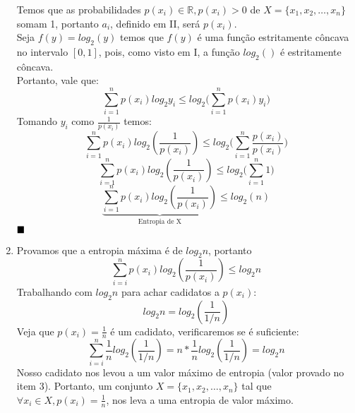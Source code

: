 \documentclass[12pt]{article}
\newcommand{\bb}[1]{\mathbb{#1}}
\newcommand{\R}{\bb{R}}
\begin{document}
\begin{enumerate}
	Temos que as probabilidades $p(x_i) \in \R, p(x_i) > 0$ de $X = \{x_1, x_2, \dots, x_n\}$ somam 1, portanto
	 $a_i$, definido em II, será $p(x_i)$.\\
	 Seja $f(y) = log_2(y)$ temos que $f(y)$ é uma função estritamente côncava no intervalo $[0, 1]$,
	 pois, como visto em I, a função $log_2()$ é estritamente côncava.\\
	 Portanto, vale que:
	 $${\sum_{i = 1} ^ {n} p(x_i) log_2 y_i} \leq log_2({\sum_{i = 1} ^ {n} p(x_i)y_i)}$$
	 Tomando $y_i$ como $\frac {1}{p(x_i)}$ temos:
	 $${\sum_{i = 1} ^ {n} p(x_i) log_2 (\frac{1}{p(x_i)})} \leq log_2({\sum_{i = 1} ^ {n} \frac{p(x_i)}{p(x_i)})}$$
	 $${\sum_{i = 1} ^ {n} p(x_i) log_2 (\frac{1}{p(x_i)})} \leq log_2({\sum_{i = 1} ^ {n} 1)}$$
	 $${\underbrace{\sum_{i = 1} ^ {n} p(x_i) log_2 (\frac{1}{p(x_i)})}_\text{Entropia de X} \leq log_2(n)}$$
	 $\hfill\blacksquare$
	 
	 \item
	 	Provamos que a entropia máxima é de $log_2 n$, portanto 
	 	$$\sum_{i = i} ^ {n} p(x_i)log_2(\frac{1}{p(x_i)}) \leq log_2 n$$
	 	Trabalhando com $log_2 n$ para achar cadidatos a $p(x_i)$:
	 	$$log_2 n = log_2 (\frac{1}{1/n})$$
	 	Veja que $p(x_i) =  \frac{1}{n}$ é um cadidato, verificaremos se é suficiente:
	 	$$\sum_{i = i} ^ {n} \frac{1}{n}log_2(\frac{1}{1/n}) = n * \frac{1}{n}log_2(\frac{1}{1/n}) = log_2 n $$
	 	Nosso cadidato nos levou a um valor máximo de entropia (valor provado no item 3). 
	 	Portanto, um conjunto $X = \{x_1, x_2, \dots, x_n\}$ tal que $\forall x_i \in X, p(x_i) = \frac{1}{n}$,
	 	nos leva a uma entropia de valor máximo.
	
	 

\end{enumerate}
\end{document}
